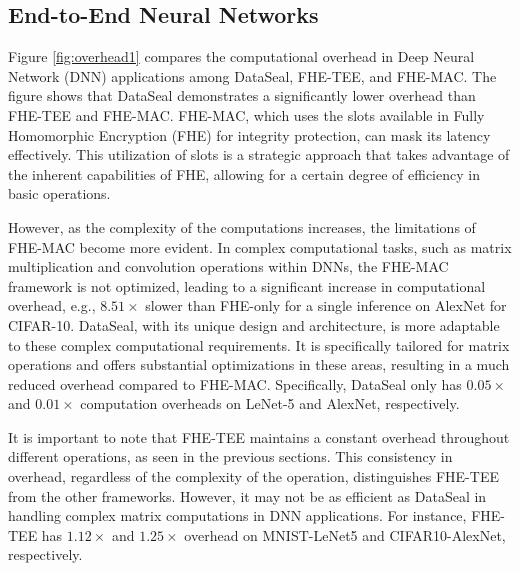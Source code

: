 \subsection{End-to-End Neural Networks}

Figure \ref{fig:overhead1} compares the computational overhead in Deep Neural Network (DNN) applications among DataSeal, FHE-TEE, and FHE-MAC. The figure shows that DataSeal demonstrates a significantly lower overhead than FHE-TEE and FHE-MAC. FHE-MAC, which uses the slots available in Fully Homomorphic Encryption (FHE) for integrity protection, can mask its latency effectively. This utilization of slots is a strategic approach that takes advantage of the inherent capabilities of FHE, allowing for a certain degree of efficiency in basic operations.

However, as the complexity of the computations increases, the limitations of FHE-MAC become more evident. In complex computational tasks, such as matrix multiplication and convolution operations within DNNs, the FHE-MAC framework is not optimized, leading to a significant increase in computational overhead, e.g., $8.51\times$ slower than FHE-only for a single inference on AlexNet for CIFAR-10. DataSeal, with its unique design and architecture, is more adaptable to these complex computational requirements. It is specifically tailored for matrix operations and offers substantial optimizations in these areas, resulting in a much reduced overhead compared to FHE-MAC. Specifically, DataSeal only has $0.05\times$ and $0.01\times$ computation overheads on LeNet-5 and AlexNet, respectively. 

It is important to note that FHE-TEE maintains a constant overhead throughout different operations, as seen in the previous sections. This consistency in overhead, regardless of the complexity of the operation, distinguishes FHE-TEE from the other frameworks. However, it may not be as efficient as DataSeal in handling complex matrix computations in DNN applications. For instance, FHE-TEE has $1.12\times$ and $1.25\times$ overhead on MNIST-LeNet5 and CIFAR10-AlexNet, respectively.
